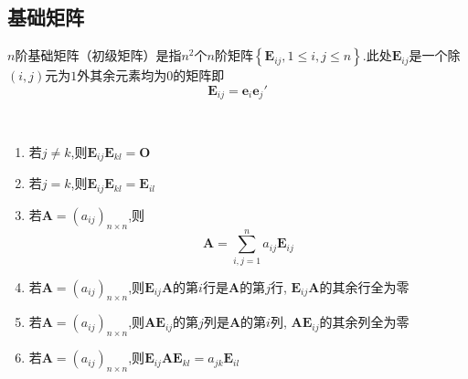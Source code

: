 \subsection{基础矩阵}
\begin{formal}
\begin{definition}\label{def:基础矩阵}
    $n$阶基础矩阵（初级矩阵）是指$n^2$个$n$阶矩阵$\left\{
        \bm{E}_{ij},1\leqslant i,j\leqslant n
    \right\}.$此处$\bm{E}_{ij}$是一个除$\left(i,j\right)$元为$1$外其余元素均为$0$的矩阵即
    \[
    \bm{E}_{ij}=\bm{e}_i\bm{e}_j'
    \]
\end{definition}
\end{formal}
\begin{formal}
\begin{proposition}[基础矩阵的若干性质]
    \,
    \begin{enumerate}[label={\textup{(\arabic*)}}]
        \item 若$j\neq k$,则$\bm{E}_{ij}\bm{E}_{kl}=\bm{O}$
        \item 若$j=k$,则$\bm{E}_{ij}\bm{E}_{kl}=\bm{E}_{il}$
        \item 若$\bm{A}=\left(a_{ij}\right)_{n\times n}$,则
        \[
        \bm{A}=\sum_{i,j=1}^{n}a_{ij}\bm{E}_{ij}
        \]
        \item 若$\bm{A}=\left(a_{ij}\right)_{n\times n}$,则$\bm{E}_{ij}\bm{A}$的第$i$行是$\bm{A}$的第$j$行,
        $\bm{E}_{ij}\bm{A}$的其余行全为零
        \item 若$\bm{A}=\left(a_{ij}\right)_{n
        \times n}$,则$\bm{A}\bm{E}_{ij}$的第$j$列是$\bm{A}$的第$i$列,
        $\bm{A}\bm{E}_{ij}$的其余列全为零
        \item 若$\bm{A}=\left(a_{ij}\right)_{n\times n}$,则$\bm{E}_{ij}\bm{A}\bm{E}_{kl}=a_{jk}\bm{E}_{il}$
    \end{enumerate}
\end{proposition}
\end{formal}
